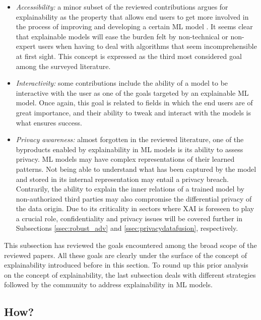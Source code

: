\documentclass[final]{elsarticle}
\begin{document}
\begin{itemize}[leftmargin=*]
    \item \textit{Accessibility:} a minor subset of the reviewed contributions argues for explainability as the property that allows end users to get more involved in the process of improving and developing a certain ML model \cite{chander2018working,UsersAtChargeOfDesing} . It seems clear that explainable models will ease the burden felt by non-technical or non-expert users when having to deal with algorithms that seem incomprehensible at first sight. This concept is expressed as the third most considered goal among the surveyed literature. 
    
    \item \textit{Interactivity:} some contributions \cite{harbers2010design,ExplainableAgencyAgents} include the ability of a model to be interactive with the user as one of the goals targeted by an explainable ML model. Once again, this goal is related to fields in which the end users are of great importance, and their ability to tweak and interact with the models is what ensures success.
    
    \item \textit{Privacy awareness:} almost forgotten in the reviewed literature, one of the byproducts enabled by explainability in ML models is its ability to assess privacy. ML models may have complex representations of their learned patterns. Not being able to understand what has been captured by the model \cite{Castelvecchi16} and stored in its internal representation may entail a privacy breach. Contrarily, the ability to explain the inner relations of a trained model by non-authorized third parties may also compromise the differential privacy of the data origin. Due to its criticality in sectors where XAI is foreseen to play a crucial role, confidentiality and privacy issues will be covered further in Subsections \ref{ssec:robust_adv} and \ref{ssec:privacydatafusion}, respectively.
    
\end{itemize}

This subsection has reviewed the goals encountered among the broad scope of the reviewed papers. All these goals are clearly under the surface of the concept of explainability introduced before in this section. To round up this prior analysis on the concept of explainability, the last subsection deals with different strategies followed by the community to address explainability in ML models.

\subsection{How?}
\end{document}
